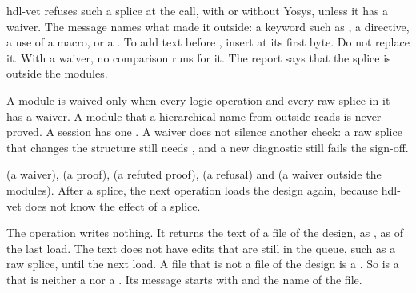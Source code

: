 \begin{entry}{}
\begin{itemize}
    hdl-vet refuses such a splice at the call, with or without Yosys, unless it has a
    waiver. The message names what made it outside: a keyword such as , a
    directive, a use of a macro, or a . To add text before ,
    insert at its first byte. Do not replace it. With a waiver, no comparison runs for it. The report says that the splice is
    outside the modules.
  \end{itemize}
  A module is waived only when every logic operation and every raw splice in it has a
  waiver. A module that a hierarchical name from outside reads is never proved. A session has
  one . A waiver does not silence another check: a raw splice that changes the structure
  still needs , and a new diagnostic still fails the sign-off.
\item[Example]  (a waiver),  (a proof),
   (a refuted proof),  (a refusal) and
   (a waiver outside the modules). After a splice, the next operation
  loads the design again, because hdl-vet does not know the effect of a splice.
\end{entry}

\begin{entry}{}
\item[Writes] The operation writes nothing. It returns the text of a file of the design,
  as , as of the last load. The text does not have edits that are still in the
  queue, such as a raw splice, until the next load. A file that is not a file of the design
  is a . So is a  that is neither a  nor a .
  Its message starts with  and the name of the file.
\end{entry}

